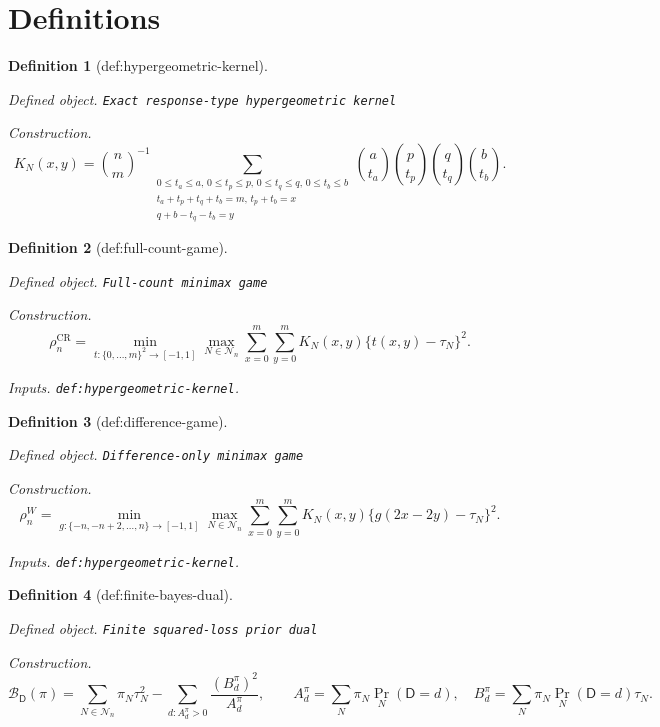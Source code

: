 \documentclass{article}
\newtheorem{definition}{Definition}
\begin{document}
\section{Definitions}

\begin{definition}[def:hypergeometric-kernel]\label{def:hypergeometric-kernel}
\par\smallskip\noindent\emph{Defined object.} \texttt{Exact response-\allowbreak{}type hypergeometric kernel}
\par\smallskip\noindent\emph{Construction.} \[K_N(x,y)=\binom{n}{m}^{-1}\!\!\sum_{\substack{0\le t_a\le a,\,0\le t_p\le p,\,0\le t_q\le q,\,0\le t_b\le b\\t_a+t_p+t_q+t_b=m,\,t_p+t_b=x\\q+b-t_q-t_b=y}}\binom a{t_a}\binom p{t_p}\binom q{t_q}\binom b{t_b}.\]
\end{definition}

\begin{definition}[def:full-count-game]\label{def:full-count-game}
\par\smallskip\noindent\emph{Defined object.} \texttt{Full-\allowbreak{}count minimax game}
\par\smallskip\noindent\emph{Construction.} \[\rho_n^{\mathrm{CR}}=\min_{t:\{0,\ldots,m\}^2\to[-1,1]}\max_{N\in\mathcal N_n}\sum_{x=0}^m\sum_{y=0}^mK_N(x,y)\{t(x,y)-\tau_N\}^2.\]
\par\smallskip\noindent\emph{Inputs.} \texttt{def:\allowbreak{}hypergeometric-\allowbreak{}kernel}.
\end{definition}

\begin{definition}[def:difference-game]\label{def:difference-game}
\par\smallskip\noindent\emph{Defined object.} \texttt{Difference-\allowbreak{}only minimax game}
\par\smallskip\noindent\emph{Construction.} \[\rho_n^W=\min_{g:\{-n,-n+2,\ldots,n\}\to[-1,1]}\max_{N\in\mathcal N_n}\sum_{x=0}^m\sum_{y=0}^mK_N(x,y)\{g(2x-2y)-\tau_N\}^2.\]
\par\smallskip\noindent\emph{Inputs.} \texttt{def:\allowbreak{}hypergeometric-\allowbreak{}kernel}.
\end{definition}

\begin{definition}[def:finite-bayes-dual]\label{def:finite-bayes-dual}
\par\smallskip\noindent\emph{Defined object.} \texttt{Finite squared-\allowbreak{}loss prior dual}
\par\smallskip\noindent\emph{Construction.} \[\mathcal B_{\mathsf D}(\pi)=\sum_{N\in\mathcal N_n}\pi_N\tau_N^2-\sum_{d:A_d^{\pi}>0}\frac{(B_d^{\pi})^2}{A_d^{\pi}},\qquad A_d^{\pi}=\sum_N\pi_N\Pr_N(\mathsf D=d),\quad B_d^{\pi}=\sum_N\pi_N\Pr_N(\mathsf D=d)\tau_N.\]
\end{definition}
\end{document}

